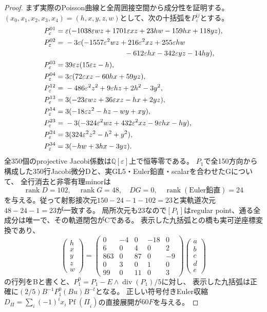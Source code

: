 \documentclass[a4paper,11pt]{ltjsarticle}
\theoremstyle{definition}
\newcommand{\rank}{\operatorname{rank}}
\begin{document}
\begin{proof}
まず実際のPoisson曲線と全周囲接空間から成分性を証明する。
$(x_0,x_1,x_2,x_3,x_4)=(h,x,y,z,w)$として、次の十括弧を$P_\varepsilon^{ij}$とする。
\[
\begin{aligned}
 P^{01}_\varepsilon={}&\varepsilon(-1038\varepsilon wz+1701\varepsilon xz+23hw-159hx+118yz),\\
 P^{02}_\varepsilon={}&-3\varepsilon(-1557\varepsilon^2wz+216\varepsilon^2xz+255\varepsilon hw\\
 &\hspace{29mm}-612\varepsilon hx-342\varepsilon yz-14hy),\\
 P^{03}_\varepsilon={}&39\varepsilon z(15\varepsilon z-h),\\
 P^{04}_\varepsilon={}&3\varepsilon(72\varepsilon xz-60hx+59yz),\\
 P^{12}_\varepsilon={}&-486\varepsilon^2z^2+9\varepsilon hz+2h^2-3y^2,\\
 P^{13}_\varepsilon={}&3(-23\varepsilon wz+36\varepsilon xz-hx+2yz),\\
 P^{14}_\varepsilon={}&3(-18\varepsilon z^2-hz-wy+xy),\\
 P^{23}_\varepsilon={}&-3(-324\varepsilon^2wz+432\varepsilon^2xz-9\varepsilon hx-hy),\\
 P^{24}_\varepsilon={}&3(324\varepsilon^2z^2-h^2+y^2),\\
 P^{34}_\varepsilon={}&3(-hw+3hx-3yz).
\end{aligned}
\]
全350個のprojective Jacobi係数は$\mathbb Q[\varepsilon]$上で恒等零である。
$P_1$で全150方向から構成した350行Jacobi微分Dと、実GL5・Euler鉛直・scalarを合わせたGについて、
全行消去と非零有理minorは
\[
 \rank D=102,\quad\rank G=48,\quad DG=0,\quad\rank(\text{Euler鉛直})=24
\]
を与える。従って射影接次元$150-24-1-102=23$と実軌道次元$48-24-1=23$が一致する。
局所次元も23なので$[P_1]$はregular point、通る全成分は唯一で、その軌道閉包がCである。
表示した九括弧との橋も実可逆座標変換であり、
\[
 \begin{pmatrix}h\\x\\y\\z\\w\end{pmatrix}
 =\begin{pmatrix}
 0&-4&0&-18&0\\6&0&4&0&2\\863&0&87&0&-9\\
 0&3&0&1&0\\99&0&11&0&3
 \end{pmatrix}
 \begin{pmatrix}a\\b\\c\\d\\e\end{pmatrix}
\]
の行列をBと書くと、$P_1^0=P_1-E\wedge\operatorname{div}(P_1)/5$に対し、
表示した九括弧は正確に$(2/5)B^{-1}P_1^0(Bu)B^{-t}$となる。
正しい符号付きEuler収縮$D_\Pi=\sum_i(-1)^ix_i\operatorname{Pf}(\Pi_{\widehat i})$の直接展開が$60F$を与える。


\end{proof}
\end{document}

